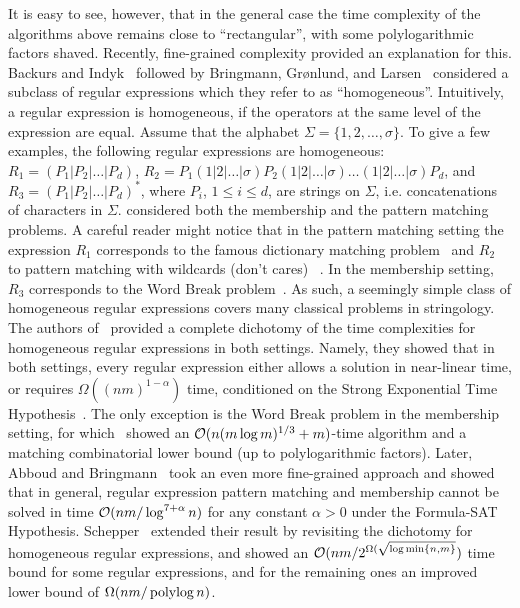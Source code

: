It is easy to see, however, that in the general case the time complexity of the algorithms above remains close to ``rectangular'', with some polylogarithmic factors shaved.
Recently, fine-grained complexity provided an explanation for this.
Backurs and Indyk~\cite{DBLP:conf/focs/BackursI16} followed by Bringmann, Gr{\o}nlund, and Larsen~\cite{8104068} considered a subclass of regular expressions which they refer to as ``homogeneous''.  Intuitively, a regular expression is homogeneous, if the operators at the same level of the expression are equal. 
Assume that the alphabet $\Sigma = \{1, 2,\ldots, \sigma\}$. To give a few examples, the following regular expressions are homogeneous: $R_1 = (P_1 | P_2 | \ldots | P_d)$, $R_2 = P_1 (1|2|\ldots|\sigma) P_2 (1|2|\ldots|\sigma) \ldots (1|2|\ldots|\sigma) P_d$, and $R_3 = (P_1 | P_2 | \ldots | P_d)^\ast$, where $P_i$, $1 \le i \le d$, are strings on $\Sigma$, i.e. concatenations of characters in $\Sigma$. \cite{DBLP:conf/focs/BackursI16,8104068} considered both the membership and the pattern matching problems. A careful reader might notice that in the pattern matching setting the expression $R_1$ corresponds to the famous dictionary matching problem~\cite{10.1145/360825.360855} and $R_2$ to pattern matching with wildcards (don't cares) ~\cite{10.5555/889566,10.5555/545381.545468,10.1145/509907.509992,10.5555/795664.796430,CLIFFORD200753}. 
In the membership setting, $R_3$ corresponds to the Word Break problem~\cite{wordbreak1,wordbreak2}. As such, a seemingly simple class of homogeneous regular expressions covers many classical problems in stringology. The authors of~\cite{DBLP:conf/focs/BackursI16,8104068} provided a complete dichotomy of the time complexities for homogeneous regular expressions in both settings. Namely, they showed that in both settings, every regular expression either allows a solution in near-linear time, or requires $\Omega((nm)^{1-\alpha})$ time, conditioned on the Strong Exponential Time Hypothesis~\cite{IMPAGLIAZZO2001367}. The only exception is the Word Break problem in the membership setting, for which~\cite{8104068} showed an $\mathcal{O}(n (m \log m)^{1/3}+m)$-time algorithm and a matching combinatorial lower bound (up to polylogarithmic factors).
Later, Abboud and Bringmann~\cite{DBLP:conf/icalp/AbboudB18} took an even more fine-grained approach and
showed that in general, regular expression pattern matching and membership cannot be solved in time $\mathcal{O}(nm/ \log^{7+\alpha} n)$ for any constant $\alpha > 0$ under the Formula-SAT Hypothesis. Schepper~\cite{schepper:LIPIcs:2020:12946} extended their result
by revisiting the dichotomy for homogeneous regular expressions,
and showed an $\mathcal{O}(nm/2^{\Omega(\sqrt{\log {\min\{n,m\}}}})$ time bound for some regular expressions, and for the remaining ones an improved lower bound of $\Omega(nm/\operatorname{polylog} n)$.  
 
